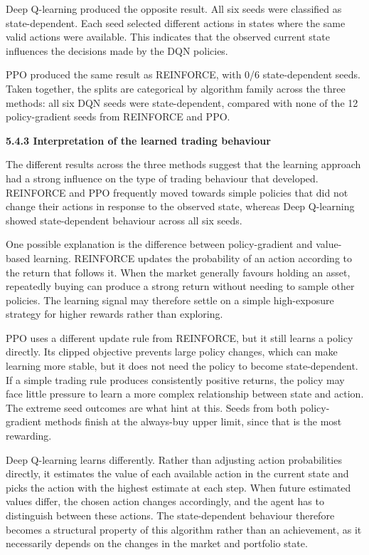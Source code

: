 Deep Q-learning produced the opposite result. All six seeds were
classified as state-dependent. Each seed selected different actions in
states where the same valid actions were available. This indicates that
the observed current state influences the decisions made by the DQN
policies.

PPO produced the same result as REINFORCE, with 0/6 state-dependent
seeds. Taken together, the splits are categorical by algorithm family
across the three methods: all six DQN seeds were state-dependent,
compared with none of the 12 policy-gradient seeds from REINFORCE and
PPO.

\textbf{5.4.3 Interpretation of the learned trading behaviour}

The different results across the three methods suggest that the learning
approach had a strong influence on the type of trading behaviour that
developed. REINFORCE and PPO frequently moved towards simple policies
that did not change their actions in response to the observed state,
whereas Deep Q-learning showed state-dependent behaviour across all six
seeds.

One possible explanation is the difference between policy-gradient and
value-based learning. REINFORCE updates the probability of an action
according to the return that follows it. When the market generally
favours holding an asset, repeatedly buying can produce a strong return
without needing to sample other policies. The learning signal may
therefore settle on a simple high-exposure strategy for higher rewards
rather than exploring.

PPO uses a different update rule from REINFORCE, but it still learns a
policy directly. Its clipped objective prevents large policy changes,
which can make learning more stable, but it does not need the policy to
become state-dependent. If a simple trading rule produces consistently
positive returns, the policy may face little pressure to learn a more
complex relationship between state and action. The extreme seed outcomes
are what hint at this. Seeds from both policy-gradient methods finish at
the always-buy upper limit, since that is the most rewarding.

Deep Q-learning learns differently. Rather than adjusting action
probabilities directly, it estimates the value of each available action
in the current state and picks the action with the highest estimate at
each step. When future estimated values differ, the chosen action
changes accordingly, and the agent has to distinguish between these
actions. The state-dependent behaviour therefore becomes a structural
property of this algorithm rather than an achievement, as it necessarily
depends on the changes in the market and portfolio state.

